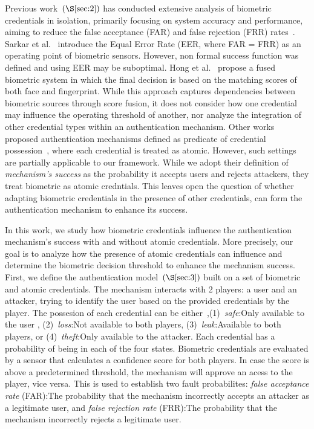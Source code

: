 \documentclass[sigconf]{acmart}
\theoremstyle{definition}
\begin{document}
Previous work~$(\S\ref{sec:2})$ has conducted extensive analysis of biometric credentials in isolation, primarily focusing on system accuracy and performance, aiming to reduce the false acceptance (FAR) and false rejection (FRR) rates~\cite{Anil1997,prabhakar2003}. Sarkar et al.~\cite{sarkar2020} introduce the Equal Error Rate (EER, where FAR = FRR) as an operating point of biometric sensors. However, non formal success function was defined and using EER may be suboptimal. Hong et al.~\cite{hong1998} propose a fused biometric system in which the final decision is based on the matching scores of both face and fingerprint. While this approach captures dependencies between biometric sources through score fusion, it does not consider how one credential may influence the operating threshold of another, nor analyze the integration of other credential types within an authentication mechanism. Other works proposed authentication mechanisms defined as predicate of credential possession~\cite{maram2024,mouallem2024,Eyal2021,Abhishek2013}, where each credential is treated as atomic. However, such settings are partially applicable to our framework. While we adopt their definition of \emph{mechanism's success} as the probability it accepts users and rejects attackers, they treat biometric as atomic credntials. This leaves open the question of whether adapting biometric credentials in the presence of other credentials, can form the authentication mechanism to enhance its success.

In this work, we study how biometric credentials influence the authentication mechanism's success with and without atomic credentials. More precisely, our goal is to analyze how the presence of atomic credentials can influence and determine the biometric decision threshold to enhance the mechanism success. First, we define the authentication model~$(\S\ref{sec:3})$ built on a set of biometric and atomic credentials. The mechanism interacts with 2 players: a user and an attacker, trying to identify the user based on the provided credentials by the player. The possesion of each credential can be either~\cite{Eyal2021},(1)~\emph{safe}:Only available to the user , (2)~\emph{loss}:Not available to both players, (3)~\emph{leak}:Available to both players, or (4)~\emph{theft}:Only available to the attacker. Each credential has a probability of being in each of the four states. Biometric credentials are evaluated by a sensor that calculates a confidence score for both players. In case the score is above a predetermined threshold, the mechanism will approve an acess to the player, vice versa. This is used to establish two fault probabilites: \emph{false acceptance rate} (FAR):The probability that the mechanism incorrectly accepts an attacker as a legitimate user, and \emph{false rejection rate} (FRR):The probability that the mechanism incorrectly rejects a legitimate user.
\end{document}
